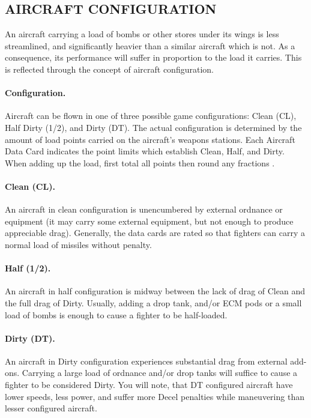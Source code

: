 \advancedrules

\subsection{AIRCRAFT CONFIGURATION}

An aircraft carrying a load of bombs or other stores under its wings is less streamlined, and significantly heavier than a similar aircraft which is not. As a consequence, its performance will suffer in proportion to the load it carries. This is reflected through the concept of aircraft configuration.

\paragraph{Configuration.} Aircraft can be flown in one of three possible game configurations: Clean (CL), Half Dirty (1/2), and Dirty (DT). The actual configuration is determined by the amount of load points carried on the aircraft's weapons stations.  Each Aircraft Data Card indicates the point limits which establish Clean, Half, and Dirty. When adding up the load, first total all points then round any fractions .

\paragraph{Clean (CL).} An aircraft in clean configuration is unencumbered by external ordnance or equipment (it may carry some external equipment, but not enough to produce appreciable drag). Generally, the data cards are rated so that fighters can carry a normal load of missiles without penalty.

\paragraph{Half (1/2).} An aircraft in half configuration is midway between the lack of drag of Clean and the full drag of Dirty. Usually, adding a drop tank, and/or ECM pods or a small load of bombs is enough to cause a fighter to be half-loaded.

\paragraph{Dirty (DT).} An aircraft in Dirty configuration experiences substantial drag from external add-ons. Carrying a large load of ordnance and/or drop tanks will suffice to cause a fighter to be considered Dirty. You will note, that DT configured aircraft have lower speeds, less power, and suffer more Decel penalties while maneuvering than lesser configured aircraft.

